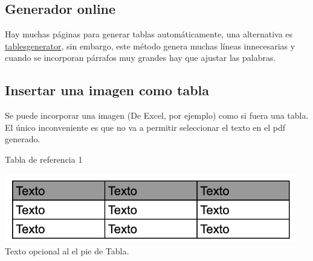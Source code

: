 \subsection{Generador online}
Hay muchas páginas para generar tablas automáticamente, una alternativa es \href{https://www.tablesgenerator.com}{tablesgenerator}, sin embargo, este método genera muchas líneas innecesarias y cuando se incorporan párrafos muy grandes hay que ajustar las palabras.

\subsection{Insertar una imagen como tabla}
Se puede incorporar una imagen (De Excel, por ejemplo) como si fuera una tabla. El único inconveniente es que no va a permitir seleccionar el texto en el pdf generado.
\begin{table}[H]
    \centering
    \caption{Tabla de referencia 1}
    \includegraphics[height=3cm]{img/tablaejemplo.png} 
    \\ \scriptsize{Texto opcional al el pie de Tabla.}
    \label{img:referencia3}
\end{table}


